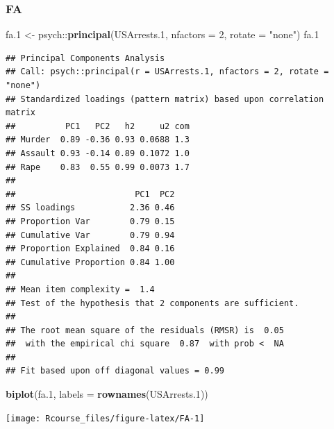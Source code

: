\documentclass[]{book}
\newenvironment{Shaded}{\begin{snugshade}}{\end{snugshade}}
\newcommand{\KeywordTok}[1]{\textcolor[rgb]{0.13,0.29,0.53}{\textbf{{#1}}}}
\newcommand{\DataTypeTok}[1]{\textcolor[rgb]{0.13,0.29,0.53}{{#1}}}
\newcommand{\DecValTok}[1]{\textcolor[rgb]{0.00,0.00,0.81}{{#1}}}
\newcommand{\FloatTok}[1]{\textcolor[rgb]{0.00,0.00,0.81}{{#1}}}
\newcommand{\StringTok}[1]{\textcolor[rgb]{0.31,0.60,0.02}{{#1}}}
\newcommand{\CommentTok}[1]{\textcolor[rgb]{0.56,0.35,0.01}{\textit{{#1}}}}
\newcommand{\NormalTok}[1]{{#1}}
\theoremstyle{definition}
\theoremstyle{definition}
\theoremstyle{remark}
\begin{document}
\subsubsection{FA}\label{fa}

\begin{Shaded}
\begin{Highlighting}[]
\NormalTok{fa}\FloatTok{.1} \NormalTok{<-}\StringTok{ }\NormalTok{psych::}\KeywordTok{principal}\NormalTok{(USArrests}\FloatTok{.1}\NormalTok{, }\DataTypeTok{nfactors =} \DecValTok{2}\NormalTok{, }\DataTypeTok{rotate =} \StringTok{"none"}\NormalTok{)}
\NormalTok{fa}\FloatTok{.1}
\end{Highlighting}
\end{Shaded}

\begin{verbatim}
## Principal Components Analysis
## Call: psych::principal(r = USArrests.1, nfactors = 2, rotate = "none")
## Standardized loadings (pattern matrix) based upon correlation matrix
##          PC1   PC2   h2     u2 com
## Murder  0.89 -0.36 0.93 0.0688 1.3
## Assault 0.93 -0.14 0.89 0.1072 1.0
## Rape    0.83  0.55 0.99 0.0073 1.7
## 
##                        PC1  PC2
## SS loadings           2.36 0.46
## Proportion Var        0.79 0.15
## Cumulative Var        0.79 0.94
## Proportion Explained  0.84 0.16
## Cumulative Proportion 0.84 1.00
## 
## Mean item complexity =  1.4
## Test of the hypothesis that 2 components are sufficient.
## 
## The root mean square of the residuals (RMSR) is  0.05 
##  with the empirical chi square  0.87  with prob <  NA 
## 
## Fit based upon off diagonal values = 0.99
\end{verbatim}

\begin{Shaded}
\begin{Highlighting}[]
\KeywordTok{biplot}\NormalTok{(fa}\FloatTok{.1}\NormalTok{, }\DataTypeTok{labels =}  \KeywordTok{rownames}\NormalTok{(USArrests}\FloatTok{.1}\NormalTok{)) }
\end{Highlighting}
\end{Shaded}

\texttt{[image: Rcourse\_files/figure-latex/FA-1]}

\begin{Shaded}
\end{Shaded}
\end{document}
